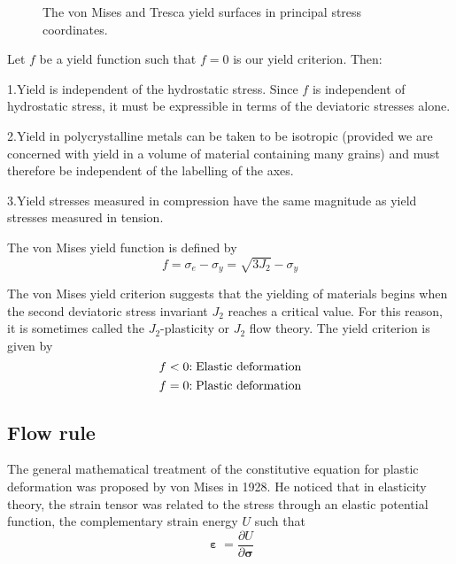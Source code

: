 \begin{figure}[!htp]
\centering{}
\caption{The von Mises and Tresca yield surfaces in principal stress coordinates.}
\label{Fig:YieldSurface2D}
\end{figure}

Let $f$ be a yield function such that $f = 0$ is our yield criterion. Then:

1.Yield is independent of the hydrostatic stress.
Since $f$ is independent of hydrostatic stress, it must be expressible in terms of the deviatoric stresses alone.

2.Yield in polycrystalline metals can be taken to be isotropic (provided we are concerned with yield in a volume of material containing many grains) and must therefore be independent of the labelling of the axes.

3.Yield stresses measured in compression have the same magnitude as yield stresses measured in tension.

The von Mises yield function is defined by
\begin{equation}
f = \sigma_e-\sigma_y =\sqrt{3J_2}-\sigma_y
\end{equation}

The von Mises yield criterion suggests that the yielding of materials begins when the second deviatoric stress invariant $J_2$ reaches a critical value.
For this reason, it is sometimes called the $J_2$-plasticity or $J_2$ flow theory.
The yield criterion is given by
\[f<0\rm{: Elastic\ deformation}\]
\[f=0\rm{: Plastic\ deformation}\]




\subsection{Flow rule}
The general mathematical treatment of the constitutive equation for plastic deformation was proposed by von Mises in 1928.
He noticed that in elasticity theory, the strain tensor was related to the stress through an elastic potential function, the complementary strain energy $U$ such that
\begin{equation}
{\bm{\upepsilon }} = \frac{{\partial U}}{{\partial {\bm{\sigma }}}}
\end{equation}

